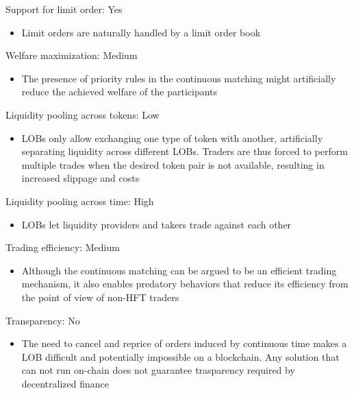 \documentclass[11pt, reqno]{amsart}
\theoremstyle{definition}
\theoremstyle{remark}
\begin{document}
	\item Support for limit order: Yes
	      \begin{itemize}
		      \item Limit orders are naturally handled by a limit order book
	      \end{itemize}
	\item Welfare maximization: Medium
	      \begin{itemize}
		      \item The presence of priority rules in the continuous matching
                might artificially reduce the achieved welfare of the participants
	      \end{itemize}
	\item Liquidity pooling across tokens: Low
	      \begin{itemize}
		      \item LOBs only allow exchanging one type of token with another,
                artificially separating liquidity across different LOBs. 
                Traders are thus forced to perform multiple trades when the
                desired token pair is not available, resulting in increased
                slippage and costs
	      \end{itemize}
	\item Liquidity pooling across time: High
	      \begin{itemize}
		      \item LOBs let liquidity providers and takers trade against each other
	      \end{itemize}
	\item Trading efficiency: Medium
	      \begin{itemize}
              \item Although the continuous matching can be argued to be an efficient
                trading mechanism, it also enables predatory behaviors that reduce
                its efficiency from the point of view of non-HFT traders
	      \end{itemize}
	\item Transparency: No
	      \begin{itemize}
		      \item The need to cancel and reprice of orders induced by continuous
                time makes a LOB difficult and potentially impossible on a blockchain.
                Any solution that can not run on-chain does not guarantee trasparency
                required by decentralized finance
	      \end{itemize}
\end{document}
